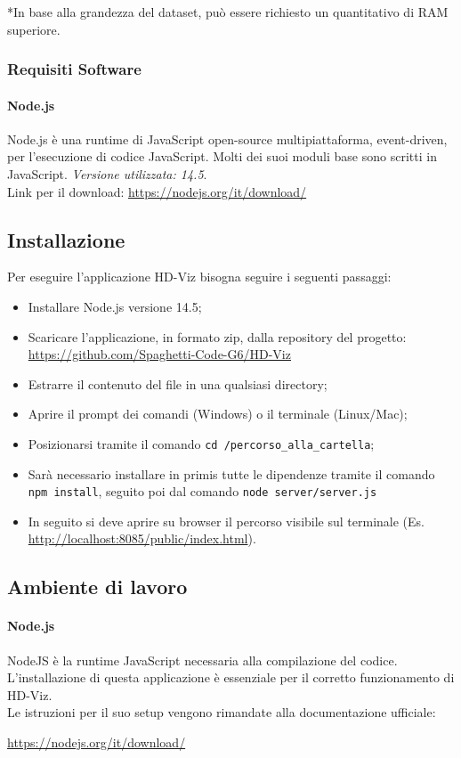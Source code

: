\documentclass[../manuale_sviluppatore.tex]{subfiles}
\begin{document}
*In base alla grandezza del dataset, può essere richiesto un quantitativo di RAM superiore.

\subsubsection{Requisiti Software}
    \label{subsub:req_s}
\paragraph{Node.js}
    \label{par:node}
Node.js è una runtime di JavaScript open-source multipiattaforma, event-driven, per l’esecuzione di codice JavaScript. Molti dei suoi moduli base sono scritti in JavaScript. 
\emph{Versione utilizzata: 14.5}.\\
Link per il download: \url{https://nodejs.org/it/download/}

\subsection{Installazione}
    \label{sub:inst}

Per eseguire l’applicazione HD-Viz bisogna seguire i seguenti passaggi:
\begin{itemize}

\item Installare Node.js versione 14.5;
\item Scaricare l’applicazione, in formato zip, dalla repository del progetto: \url{https://github.com/Spaghetti-Code-G6/HD-Viz}
\item Estrarre il contenuto del file in una qualsiasi directory; 
\item Aprire il prompt dei comandi (Windows) o il terminale (Linux/Mac); 
\item Posizionarsi tramite il comando \verb|cd /percorso_alla_cartella|;
\item Sarà necessario installare in primis tutte le dipendenze tramite il comando \verb|npm install|, seguito poi dal comando \verb|node server/server.js|
\item In seguito si deve aprire su browser il percorso visibile sul terminale (Es. \url{http://localhost:8085/public/index.html}).
\end{itemize}


\subsection{Ambiente di lavoro}

\paragraph{Node.js}
NodeJS è la runtime JavaScript necessaria alla compilazione del codice. L'installazione di questa applicazione è essenziale per il corretto funzionamento di HD-Viz.\\
Le istruzioni per il suo setup vengono rimandate alla documentazione ufficiale:
\begin{center}
\url{https://nodejs.org/it/download/}
\end{center}
\end{document}
